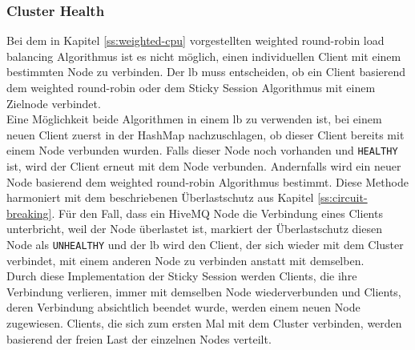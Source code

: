 \subsubsection{Cluster Health}
Bei dem in Kapitel \ref{ss:weighted-cpu} vorgestellten weighted round-robin load balancing Algorithmus ist es nicht möglich, einen individuellen Client mit einem bestimmten Node zu verbinden. Der \acl{lb} muss entscheiden, ob ein Client basierend dem weighted round-robin oder dem Sticky Session Algorithmus mit einem Zielnode verbindet.
\\
Eine Möglichkeit beide Algorithmen in einem \acl{lb} zu verwenden ist, bei einem neuen Client zuerst in der HashMap nachzuschlagen, ob dieser Client bereits mit einem Node verbunden wurden. Falls dieser Node noch vorhanden und \verb|HEALTHY| ist, wird der Client erneut mit dem Node verbunden. Andernfalls wird ein neuer Node basierend dem weighted round-robin Algorithmus bestimmt.
Diese Methode harmoniert mit dem beschriebenen Überlastschutz aus Kapitel \ref{ss:circuit-breaking}. Für den Fall, dass ein HiveMQ Node die Verbindung eines Clients unterbricht, weil der Node überlastet ist, markiert der Überlastschutz diesen Node als \verb|UNHEALTHY| und der \acl{lb} wird den Client, der sich wieder mit dem Cluster verbindet, mit einem anderen Node zu verbinden anstatt mit demselben.
\\
Durch diese Implementation der Sticky Session werden Clients, die ihre Verbindung verlieren, immer mit demselben Node wiederverbunden und Clients, deren Verbindung absichtlich beendet wurde, werden einem neuen Node zugewiesen. Clients, die sich zum ersten Mal mit dem Cluster verbinden, werden basierend der freien Last der einzelnen Nodes verteilt.
\newpage

